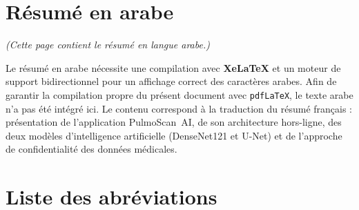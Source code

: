 \documentclass[12pt,a4paper]{report}
\begin{document}
\chapter*{Résumé en arabe}
\thispagestyle{plain}

\begin{flushright}
\itshape (Cette page contient le résumé en langue arabe.)
\end{flushright}

\begin{infobox}
Le résumé en arabe nécessite une compilation avec \textbf{XeLaTeX} et un moteur de support bidirectionnel pour un affichage correct des caractères arabes. Afin de garantir la compilation propre du présent document avec \texttt{pdfLaTeX}, le texte arabe n'a pas été intégré ici. Le contenu correspond à la traduction du résumé français : présentation de l'application PulmoScan~AI, de son architecture hors-ligne, des deux modèles d'intelligence artificielle (DenseNet121 et U-Net) et de l'approche de confidentialité des données médicales.
\end{infobox}

\renewcommand{\contentsname}{Table des matières}
\tableofcontents
\thispagestyle{plain}

\listoffigures
{}
\thispagestyle{plain}

\listoftables
{}
\thispagestyle{plain}

\chapter*{Liste des abréviations}
\thispagestyle{plain}
\end{document}
